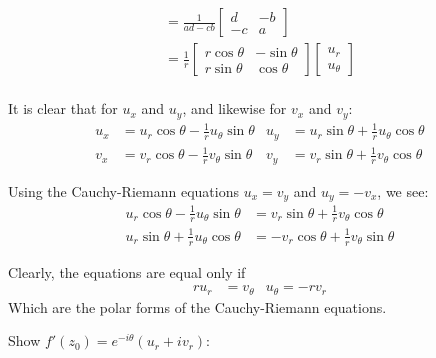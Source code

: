 \documentclass[12pt, english]{book}
\makeatletter
\renewenvironment{proof}[1][\proofname]{\par
	\pushQED{\qed}%
	\normalfont \topsep6\p@\@plus6\p@\relax
	\list{}{%
		\settowidth{\leftmargin}{\itshape\proofname:\hskip\labelsep}%
		\setlength{\labelwidth}{0pt}%
		\setlength{\itemindent}{-\leftmargin}%
		}%
	\item[\hskip\labelsep\itshape#1\@addpunct{:}]\ignorespaces
	}{\popQED\endlist\@endpefalse}
\makeatother
\begin{document}
\begin{proof}
{\begin{align*}
				  	  &=
				  	  \frac{1}{ad - cb}
				  	  \begin{bmatrix}
				  	  	d & -b \\
				  	  	-c & a
				  	  \end{bmatrix} \\
				&= \frac{1}{r}
					\begin{bmatrix}
						r\cos\theta & -\sin\theta \\
						r\sin\theta & \cos\theta
					\end{bmatrix}
					\begin{bmatrix}
						u_r \\ u_\theta
					\end{bmatrix} & \\
			\end{align*}
		
			It is clear that for \(u_x\) and \(u_y\), and likewise for \(v_x\) and \(v_y\):
			\begin{align}
				\label{Cauchy-Riemann Equations (Polar) Theorem Proof Eqn 1 - Complex}
				u_x &= u_r \cos\theta - \frac{1}{r} u_\theta \sin\theta & 
				u_y &= u_r \sin\theta + \frac{1}{r} u_\theta \cos\theta \\
				\label{Cauchy-Riemann Equations (Polar) Theorem Proof Eqn 2 - Complex}
				v_x &= v_r \cos\theta - \frac{1}{r} v_\theta \sin\theta & 
				v_y &= v_r \sin\theta + \frac{1}{r} v_\theta \cos\theta 
			\end{align}
		
			Using the Cauchy-Riemann equations \(u_x = v_y\) and \(u_y = -v_x\), we see:
			\begin{align*}
				u_r \cos\theta - \frac{1}{r}u_\theta \sin\theta 
					&= v_r \sin\theta + \frac{1}{r} v_\theta \cos\theta \\
				u_r \sin\theta + \frac{1}{r}u_\theta \cos\theta 
					&= -v_r \cos\theta + \frac{1}{r} v_\theta \sin\theta
			\end{align*}
		
			Clearly, the equations are equal only if 
			\begin{align*}
				ru_r &= v_\theta & u_\theta = -rv_r
			\end{align*}
			Which are the polar forms of the Cauchy-Riemann equations.	
		}
		
		Show \(f'(z_0) = e^{-i\theta}(u_r + iv_r)\):
		

\end{proof}
\end{document}

